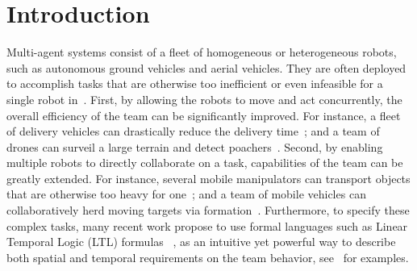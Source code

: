 \section{Introduction}\label{sec:introduction}
Multi-agent systems consist of a fleet of homogeneous or heterogeneous robots,
such as autonomous ground vehicles and aerial vehicles.
They are often deployed to accomplish tasks that are otherwise too inefficient or even infeasible for a single robot in~\cite{arai2002advances}.
First,
by allowing the robots to move and act concurrently,
the overall efficiency of the team can be significantly improved.
For instance,
a fleet of delivery vehicles can drastically reduce the delivery time~\cite{toth2002overview};
and a team of drones can surveil a large terrain and detect poachers~\cite{cliff2015online}.
Second,
by enabling multiple robots to directly collaborate on a task,
capabilities of the team can be greatly extended.
For instance,
several mobile manipulators can transport objects that are otherwise too heavy for one~\cite{fink2008multi};
and a team of mobile vehicles can collaboratively herd moving targets via formation~\cite{varava2017herding}.
Furthermore, to specify these complex tasks,
many recent work propose to use formal languages such as Linear Temporal Logic (LTL)
formulas ~\cite{baier2008principles}, as an intuitive yet powerful way to describe
both spatial and temporal requirements on the team behavior,
see~\cite{ulusoy2013optimality, kantaros2020stylus, schillinger2018simultaneous, guo2018multirobot} for examples.


